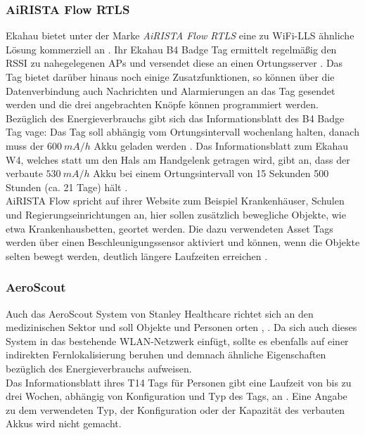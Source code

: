 \subsubsection{AiRISTA Flow RTLS}
Ekahau bietet unter der Marke \textit{AiRISTA Flow RTLS} eine zu WiFi-LLS ähnliche Lösung kommerziell an \cite{airista2017airista}.
Ihr Ekahau B4 Badge Tag ermittelt regelmäßig den RSSI zu nahegelegenen APs und versendet diese an einen Ortungsserver \cite{liu2007survey}.
Das Tag bietet darüber hinaus noch einige Zusatzfunktionen, so können über die Datenverbindung auch Nachrichten und Alarmierungen an das Tag gesendet werden und die drei angebrachten Knöpfe können programmiert werden.\\
Bezüglich des Energieverbrauchs gibt sich das Informationsblatt des B4 Badge Tag vage: Das Tag soll abhängig vom Ortungsintervall wochenlang halten, danach muss der $600\ mA/h$ Akku geladen werden \cite{ekahau2017b4}.
Das Informationsblatt zum Ekahau W4, welches statt um den Hals am Handgelenk getragen wird, gibt an, dass der verbaute $530\ mA/h$ Akku bei einem Ortungsintervall von 15 Sekunden 500 Stunden (ca. 21 Tage) hält \cite{ekahau2017w4}.\\
AiRISTA Flow spricht auf ihrer Website zum Beispiel Krankenhäuser, Schulen und Regierungseinrichtungen an, hier sollen zusätzlich bewegliche Objekte, wie etwa Krankenhausbetten, geortet werden.
Die dazu verwendeten Asset Tags werden über einen Beschleunigungssensor aktiviert und können, wenn die Objekte selten bewegt werden, deutlich längere Laufzeiten erreichen \cite{ekahau2017a4}. \\

\subsubsection{AeroScout}
Auch das AeroScout System von Stanley Healthcare richtet sich an den medizinischen Sektor und soll Objekte und Personen orten \cite{aeroscout2017asset}, \cite{aeroscout2017staff}.
Da sich auch dieses System in das bestehende WLAN-Netzwerk einfügt, sollte es ebenfalls auf einer indirekten Fernlokalisierung beruhen und demnach ähnliche Eigenschaften bezüglich des Energieverbrauchs aufweisen.\\
Das Informationsblatt ihres T14 Tags für Personen gibt eine Laufzeit von bis zu drei Wochen, abhängig von Konfiguration und Typ des Tags, an \cite{aeroscout2017t14}. 
Eine Angabe zu dem verwendeten Typ, der Konfiguration oder der Kapazität des verbauten Akkus wird nicht gemacht.\\

